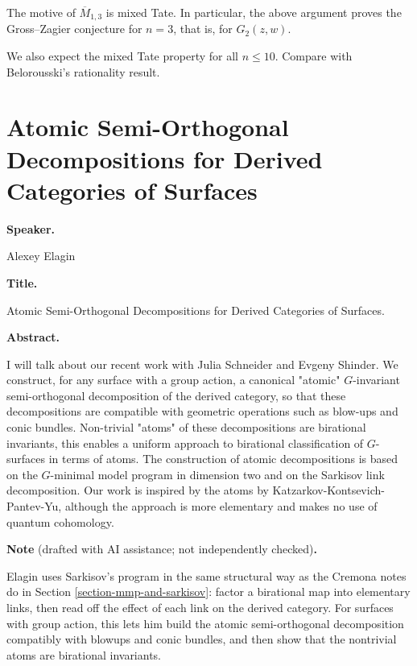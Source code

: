 \begin{theorem}
\label{theorem-motive-m}
The motive of $\overline M_{1,3}$ is
mixed Tate.
In particular, the above argument
proves the Gross--Zagier conjecture
for $n=3$, that is, for $G_2(z,w)$.
\end{theorem}

We also expect the mixed Tate property
for all $n\leq 10$.
Compare with Belorousski's rationality
result.

\section{Atomic Semi-Orthogonal
Decompositions for Derived Categories
of Surfaces}
\label{section-atomic-sod-surfaces}

\medskip\noindent
{\bf Speaker.}

Alexey Elagin

\medskip\noindent
{\bf Title.}

Atomic Semi-Orthogonal
Decompositions for Derived Categories
of Surfaces.

\medskip\noindent
{\bf Abstract.}

I will talk about our recent work
with Julia Schneider and Evgeny
Shinder.
We construct, for any surface with a
group action, a canonical "atomic"
$G$-invariant semi-orthogonal
decomposition of the derived category,
so that these decompositions are
compatible with geometric operations
such as blow-ups and conic bundles.
Non-trivial "atoms" of these
decompositions are birational
invariants, this enables a uniform
approach to birational classification
of $G$-surfaces in terms of atoms.
The construction of atomic
decompositions is based on the
$G$-minimal model program in dimension
two and on the Sarkisov link
decomposition.
Our work is inspired by the atoms by
Katzarkov-Kontsevich-Pantev-Yu,
although the approach is more
elementary and makes no use of quantum
cohomology.

\medskip\noindent
{\bf Note} (drafted with AI assistance;
not independently checked){\bf .}

Elagin uses Sarkisov's program in the
same structural way as the Cremona
notes do in Section
\ref{section-mmp-and-sarkisov}:
factor a birational map into
elementary links, then read off the
effect of each link on the derived
category.
For surfaces with group action, this
lets him build the atomic
semi-orthogonal decomposition
compatibly with blowups and conic
bundles, and then show that the
nontrivial atoms are birational
invariants.

